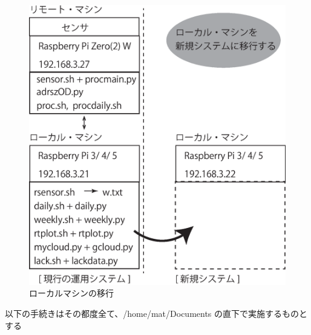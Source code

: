 \documentclass[12pt,a4j]{jsbook}
\begin{document}
\begin{figure}[htbp]
	\begin{minipage}[b]{1.0\linewidth}
		\centering
		\includegraphics[keepaspectratio, scale=0.4]{figs/eps/ikou.eps}
		\caption{ローカルマシンの移行}
	\end{minipage}
\end{figure}

以下の手続きはその都度全て、/home/mat/Documents の直下で実施するものとする
\end{document}

